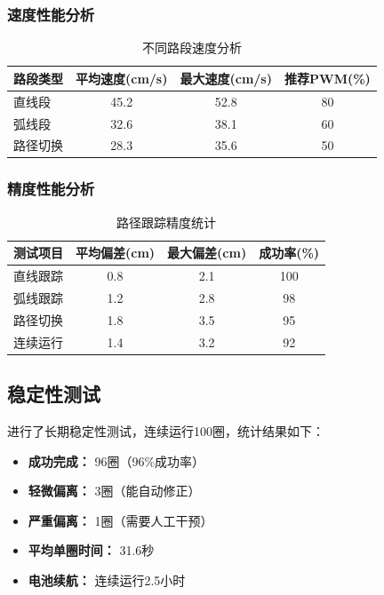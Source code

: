 \documentclass[UTF8]{ctexart}
\begin{document}
\subsubsection{速度性能分析}

\begin{table}[H]
    \centering
    \caption{不同路段速度分析}
    \label{tab:speed_analysis}
    \begin{tabular}{lccc}
        \toprule
        路段类型 & 平均速度(cm/s) & 最大速度(cm/s) & 推荐PWM(\%) \\
        \midrule
        直线段 & 45.2 & 52.8 & 80 \\
        弧线段 & 32.6 & 38.1 & 60 \\
        路径切换 & 28.3 & 35.6 & 50 \\
        \bottomrule
    \end{tabular}
\end{table}

\subsubsection{精度性能分析}

\begin{table}[H]
    \centering
    \caption{路径跟踪精度统计}
    \label{tab:precision_analysis}
    \begin{tabular}{lccc}
        \toprule
        测试项目 & 平均偏差(cm) & 最大偏差(cm) & 成功率(\%) \\
        \midrule
        直线跟踪 & 0.8 & 2.1 & 100 \\
        弧线跟踪 & 1.2 & 2.8 & 98 \\
        路径切换 & 1.8 & 3.5 & 95 \\
        连续运行 & 1.4 & 3.2 & 92 \\
        \bottomrule
    \end{tabular}
\end{table}

\subsection{稳定性测试}

进行了长期稳定性测试，连续运行100圈，统计结果如下：

\begin{itemize}
    \item \textbf{成功完成：} 96圈（96\%成功率）
    \item \textbf{轻微偏离：} 3圈（能自动修正）
    \item \textbf{严重偏离：} 1圈（需要人工干预）
    \item \textbf{平均单圈时间：} 31.6秒
    \item \textbf{电池续航：} 连续运行2.5小时
\end{itemize}
\end{document}
